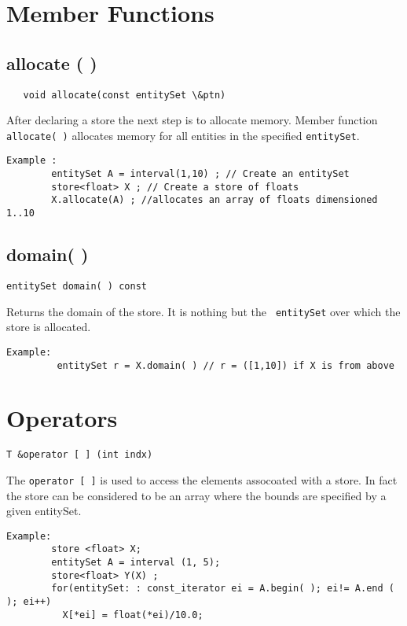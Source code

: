 \documentclass[letterpaper,12pt]{article}
\begin{document}
\section*{Member  Functions}

\subsection{allocate ( ) }

\begin{verbatim}
   void allocate(const entitySet \&ptn)  
\end{verbatim}

After declaring a store the next step is to allocate memory. Member
function {\tt allocate( )} allocates memory for all entities in the
specified {\tt entitySet}.

\begin{verbatim}
Example : 
        entitySet A = interval(1,10) ; // Create an entitySet 
        store<float> X ; // Create a store of floats
        X.allocate(A) ; //allocates an array of floats dimensioned 1..10
\end{verbatim}

\subsection{domain( )}
\begin{verbatim}
entitySet domain( ) const
\end{verbatim}

Returns the domain of the store.  It is nothing but the {\tt
entitySet} over which the store is allocated.  

\begin{verbatim}
Example: 
         entitySet r = X.domain( ) // r = ([1,10]) if X is from above
\end{verbatim}

\section*{ Operators }

\begin{verbatim}
T &operator [ ] (int indx)
\end{verbatim}

The {\tt operator [ ]} is used to access the elements assocoated with
a store. In fact the store can be considered to be an array where the
bounds are specified by a given entitySet.

\begin{verbatim}
Example:
        store <float> X;
        entitySet A = interval (1, 5);
        store<float> Y(X) ;
        for(entitySet: : const_iterator ei = A.begin( ); ei!= A.end ( ); ei++)
          X[*ei] = float(*ei)/10.0;
\end{verbatim}
\end{document}
